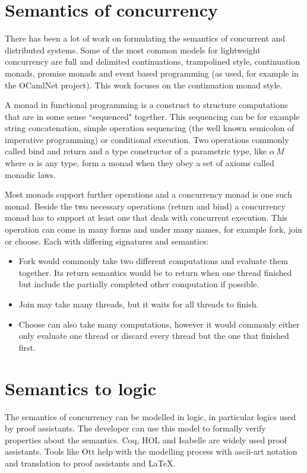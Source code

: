 \documentclass[12pt,twoside,notitlepage]{report}
\theoremstyle{plain}%
\theoremstyle{definition}
\theoremstyle{remark}
\begin{document}
\section{Semantics of concurrency}

There has been a lot of work on formulating the semantics of concurrent and distributed systems. Some of the most common models for lightweight concurrency\cite{deleuzelight} are full\cite{friedman1988applications,leroyocaml} and delimited\cite{kiselyov2010delimited} continuations\cite{shan2004shift}, trampolined style\cite{ganz1999trampolined}, continuation monads\cite{Claessen99functionalpearls}, promise monads\cite{liskov1988promises} and event based programming (as used, for example in the OCamlNet\cite{Ocamlnet} project). This work focuses on the continuation monad style.

A monad\cite{hoareetal2001tackling} in functional programming is a construct to structure computations that are in some sense ``sequenced" together. This sequencing can be for example string concatenation, simple operation sequencing (the well known semicolon of imperative programming) or conditional execution. Two operations commonly called bind and return and a type constructor of a parametric type, like $ \alpha \, M $ where $ \alpha $ is any type, form a monad when they obey a set of axioms called monadic laws.

Most monads support further operations and a concurrency monad is one such monad. Beside the two necessary operations (return and bind) a concurrency monad has to support at least one that deals with concurrent execution.  This operation can come in many forms and under many names, for example fork, join or choose. Each with differing signatures and semantics:
\begin{itemize}
\item{Fork would commonly take two different computations and evaluate them together. Its return semantics would be to return when one thread finished but include the partially completed other computation if possible.}
\item{Join may take many threads, but it waits for all threads to finish.}
\item{Choose can also take many computations, however it would commonly either only evaluate one thread or discard every thread but the one that finished first.}
\end{itemize}

\section{Semantics to logic}
The semantics of concurrency can be modelled in logic, in particular logics used by proof assistants. The developer can use this model to formally verify properties about the semantics\cite{benton2008mechanized,blazy2009mechanized,blazy2006formal,leroy2009formal}. Coq\cite{Coq}, HOL and Isabelle are widely used proof assistants. Tools like Ott\cite{Ott} help with the modelling process with ascii-art notation and translation to proof assistants and \LaTeX.
\end{document}
